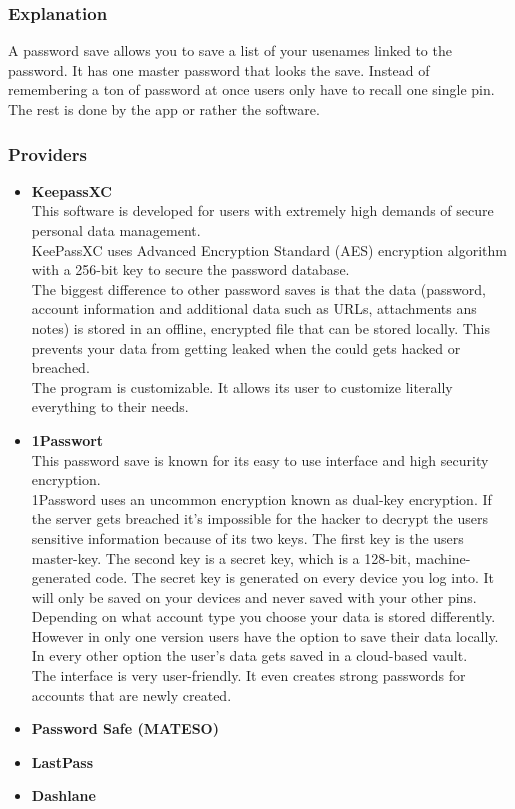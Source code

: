 \documentclass[conference]{IEEEtran}
\begin{document}
\subsubsection{Explanation}
A password save allows you to save a list of your usenames linked to the password. It has one master password that looks the save. Instead of remembering a ton of password at once users only have to recall one single pin. The rest is done by the app or rather the software.
\subsubsection{Providers}
\begin{itemize}
\item \textbf{KeepassXC}\\
This software is developed for users with extremely high demands of secure personal data management. \\
KeePassXC uses Advanced Encryption Standard (AES) encryption algorithm with a 256-bit key to secure the password database.\\
The biggest difference to other password saves is that the data (password, account information and additional data such as URLs, attachments ans notes) is stored in an offline, encrypted file that can be stored locally. This prevents your data from getting leaked when the could gets hacked or breached.\\
The program is customizable. It allows its user to customize literally everything to their needs.\\

\item \textbf{1Passwort}\\
This password save is known for its easy to use interface and high security encryption.\\
1Password uses an uncommon encryption known as dual-key encryption. If the server gets breached it's impossible for the hacker to decrypt the users sensitive information because of its two keys. The first key is the users master-key. The second key is a secret key, which is a 128-bit, machine-generated code. The secret key is generated on every device you log into. It will only be saved on your devices and never saved with your other pins.\\
Depending on what account type you choose your data is stored differently. However in only one version users have the option to save their data locally. In every other option the user's data gets saved in a cloud-based vault.\\
The interface is very user-friendly. It even creates strong passwords for accounts that are newly created.
\item \textbf{Password Safe (MATESO)}\\

\item \textbf{LastPass}\\
\item \textbf{Dashlane}\\
\end{itemize}
\end{document}
